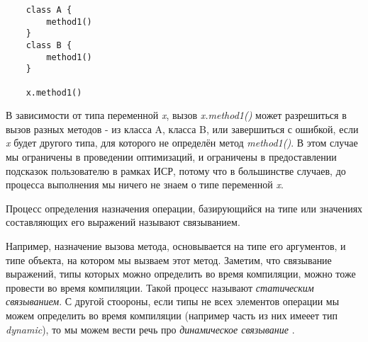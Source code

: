 \vskip4pt

\begin{verbatim}
    class A {
        method1()
    }
    class B {
        method1()
    }

    x.method1()
\end{verbatim} 

\vskip4pt


В зависимости от типа переменной \textit{x}, вызов \textit{x.method1()} может разрешиться в вызов разных методов - из класса A, класса B, или завершиться с ошибкой, если \textit{x} будет другого типа, для которого не определён метод \textit{method1()}. В этом случае мы ограничены в проведении оптимизаций, и ограничены в предоставлении подсказок пользователю в рамках ИСР, потому что в большинстве случаев, до процесса выполнения мы ничего не знаем о типе переменной \textit{x}.

\begin{definition}
    Процесс определения назначения операции, базирующийся на типе или значениях составляющих его выражений называют связыванием.
\end{definition}
Например, назначение вызова метода, основывается на типе его аргументов, и типе объекта, на котором мы вызваем этот метод. Заметим, что связывание выражений, типы которых можно определить во время компиляции, можно тоже провести во время компиляции. Такой процесс называют \textit{статическим связыванием}. С другой стоороны, если типы не всех элементов операции мы можем определить во время компиляции (например часть из них имееет тип \textit{dynamic}), то мы можем вести  речь про \textit{динамическое связывание} \cite{csharp:languageSpecification}.

